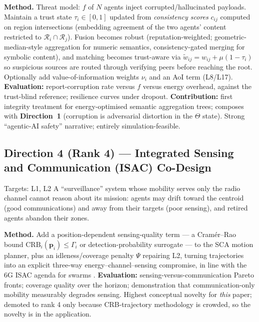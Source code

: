 \documentclass[11pt,a4paper]{article}
\newcommand{\Dir}[1]{\textcolor{accent}{\textbf{Direction~#1}}}
\begin{document}
\textbf{Method.} Threat model: $f$ of $N$ agents inject corrupted/hallucinated payloads. Maintain a trust state $\tau_i\in[0,1]$ updated from \emph{consistency scores} $c_{ij}$ computed on region intersections (embedding agreement of the two agents' content restricted to $\mathcal R_i\cap\mathcal R_j$). Fusion becomes robust (reputation-weighted; geometric-median-style aggregation for numeric semantics, consistency-gated merging for symbolic content), and matching becomes trust-aware via $\tilde w_{ij}=w_{ij}+\mu(1-\tau_i)$ so suspicious sources are routed through verifying peers before reaching the root. Optionally add value-of-information weights $\nu_i$ and an AoI term \cite{aoi} (L8/L17). \textbf{Evaluation:} report-corruption rate versus $f$ versus energy overhead, against the trust-blind reference; resilience curves under dropout. \textbf{Contribution:} first integrity treatment for energy-optimised semantic aggregation trees; composes with \Dir{1} (corruption is adversarial distortion in the $\Theta$ state). Strong ``agentic-AI safety'' narrative; entirely simulation-feasible.

\subsection{Direction 4 (Rank 4) --- Integrated Sensing and Communication (ISAC) Co-Design}
\begin{limitbox}{Targets: L1, L2}
A ``surveillance'' system whose mobility serves only the radio channel cannot reason about its mission: agents may drift toward the centroid (good communications) and away from their targets (poor sensing), and retired agents abandon their zones.
\end{limitbox}
\textbf{Method.} Add a position-dependent sensing-quality term --- a Cram\'er--Rao bound $\mathrm{CRB}_i(\mathbf p_i)\le\Gamma_i$ or detection-probability surrogate --- to the SCA motion planner, plus an idleness/coverage penalty $\Psi$ repairing L2, turning trajectories into an explicit three-way energy--channel--sensing compromise, in line with the 6G ISAC agenda for swarms \cite{isacswarm,admmisac}. \textbf{Evaluation:} sensing-versus-communication Pareto fronts; coverage quality over the horizon; demonstration that communication-only mobility measurably degrades sensing. Highest conceptual novelty for \emph{this} paper; demoted to rank 4 only because CRB-trajectory methodology is crowded, so the novelty is in the application.
\end{document}
